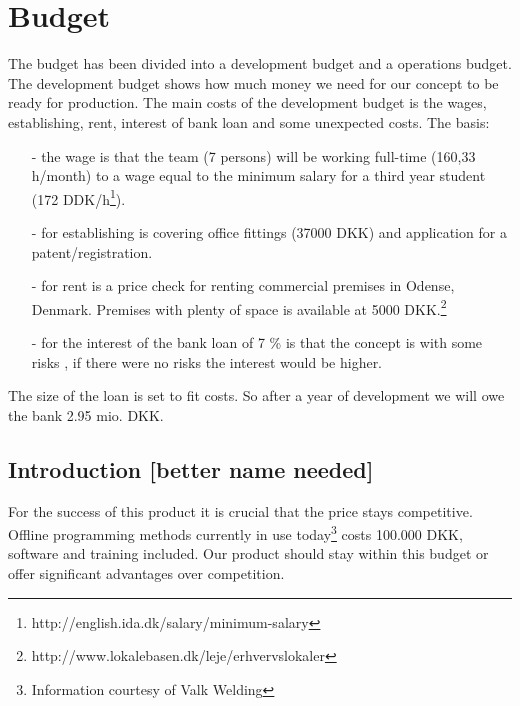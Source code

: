 \section{Budget}
\label{budget_label}
The budget has been divided into a development budget and a operations budget. The development budget shows how much money we need for our concept to be ready for production. The main costs of the development budget is the wages, establishing, rent, interest of bank loan and some unexpected costs. 
The basis: 
\begin{itemize}
\item[-] the wage is that the team (7 persons) will be working full-time (160,33 h/month) to a wage equal to the minimum salary for a third year student (172 DDK/h\footnote{http://english.ida.dk/salary/minimum-salary}).
\item[-] for establishing is covering office fittings (37000 DKK) and application for a patent/registration.
\item[-] for rent is a price check for renting commercial premises in Odense, Denmark. Premises with plenty of space is available at 5000 DKK.\footnote{http://www.lokalebasen.dk/leje/erhvervslokaler}
\item[-] for the interest of the bank loan of 7 \% is that the concept is with some risks , if there were no risks the interest would be higher. 
\end{itemize} 
The size of the loan is set to fit costs. So after a year of development we will owe the bank 2.95 mio. DKK.


\subsection{Introduction [better name needed]}
For the success of this product it is crucial that the price stays competitive. Offline programming methods currently in use today\footnote{Information courtesy of Valk Welding} costs 100.000 DKK, software and training included. Our product should stay within this budget or offer significant advantages over competition.

